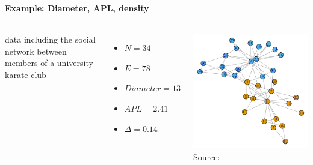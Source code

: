 \documentclass[8pt]{beamer}
\begin{document}

\begin{frame}[fragile]
\frametitle{\insertsection}
\framesubtitle{Example: Diameter, APL, density}

\begin{columns}[c]

\begin{minipage}[c][.5\textheight][c]{\linewidth}


{\color{blue}{Karate}} data including the social network between members of a university karate club
\begin{itemize}
\item $N = 34$
\item $E = 78$
\item $Diameter = 13$
\item $APL = 2.41$
\item $\Delta = 0.14$
\end{itemize}

\medskip
\medskip


\end{minipage}	   


\begin{minipage}[c][.5\textheight][c]{\linewidth}
\centering
\includegraphics[height=0.7\textheight,keepaspectratio]{karate_density}\\
\tiny Source: \cite{Zachary1977}\\
\end{minipage}

\end{columns}

\end{frame}
\end{document}

